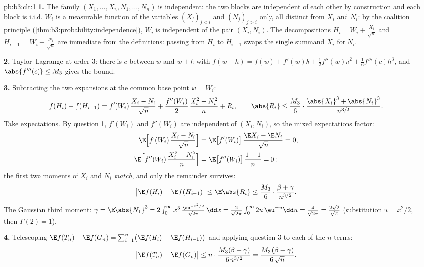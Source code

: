 \begin{solution}{pb:b3:clt:1}
\textbf{1.} The family $(X_1, \dots, X_n, N_1, \dots, N_n)$
is independent: the two blocks are independent of each
other by construction and each block is i.i.d. $W_i$ is a
measurable function of the variables $(X_j)_{j<i}$ and
$(N_j)_{j>i}$ only, all distinct from $X_i$ and $N_i$: by
the coalition principle
(\cref{thm:b3:probability:independence}), $W_i$ is
independent of the pair $(X_i, N_i)$. The decompositions
$H_i = W_i + \frac{X_i}{\sqrt n}$ and $H_{i-1} = W_i +
\frac{N_i}{\sqrt n}$ are immediate from the definitions:
passing from $H_i$ to $H_{i-1}$ swaps the single summand
$X_i$ for $N_i$.

\textbf{2.} Taylor--Lagrange at order $3$: there is $c$
between $w$ and $w + h$ with $f(w + h) = f(w) + f'(w)h +
\frac12f''(w)h^2 + \frac16f'''(c)h^3$, and $\abs{f'''(c)}
\leq M_3$ gives the bound.

\textbf{3.} Subtracting the two expansions at the common
base point $w = W_i$:
\[
f(H_i) - f(H_{i-1}) = f'(W_i)\,\frac{X_i - N_i}{\sqrt n} +
\frac{f''(W_i)}{2}\,\frac{X_i^2 - N_i^2}{n} + R_i,
\qquad
\abs{R_i} \leq \frac{M_3}{6}\cdot
\frac{\abs{X_i}^3 + \abs{N_i}^3}{n^{3/2}} .
\]
Take expectations. By question 1, $f'(W_i)$ and $f''(W_i)$
are independent of $(X_i, N_i)$, so the mixed expectations
factor:
\begin{align*}
\E\Bigl[f'(W_i)\,\frac{X_i - N_i}{\sqrt n}\Bigr] &=
\E\bigl[f'(W_i)\bigr]\,\frac{\E X_i - \E N_i}{\sqrt n} = 0,
\\
\E\Bigl[f''(W_i)\,\frac{X_i^2 - N_i^2}{n}\Bigr] &=
\E\bigl[f''(W_i)\bigr]\,\frac{1 - 1}{n} = 0 :
\end{align*}
the first two moments of $X_i$ and $N_i$ \emph{match}, and
only the remainder survives:
\[
\bigl|\E f(H_i) - \E f(H_{i-1})\bigr| \leq \E\abs{R_i} \leq
\frac{M_3}{6}\cdot\frac{\beta + \gamma}{n^{3/2}} .
\]
The Gaussian third moment: $\gamma = \E\abs{N_1}^3 =
2\int_0^\infty x^3\,\frac{\eu^{-x^2/2}}{\sqrt{2\pi}}\,\dd x
= \frac{2}{\sqrt{2\pi}}\int_0^\infty 2u\,\eu^{-u}\dd u =
\frac{4}{\sqrt{2\pi}} = \frac{2\sqrt2}{\sqrt\pi}$
(substitution $u = x^2/2$, then $\Gamma(2) = 1$).

\textbf{4.} Telescoping $\E f(T_n) - \E f(G_n) =
\sum_{i=1}^n\bigl(\E f(H_i) - \E f(H_{i-1})\bigr)$ and
applying question 3 to each of the $n$ terms:
\[
\bigl|\E f(T_n) - \E f(G_n)\bigr| \leq
n \cdot \frac{M_3(\beta + \gamma)}{6\,n^{3/2}} =
\frac{M_3\,(\beta + \gamma)}{6\,\sqrt n} .
\]


\end{solution}
